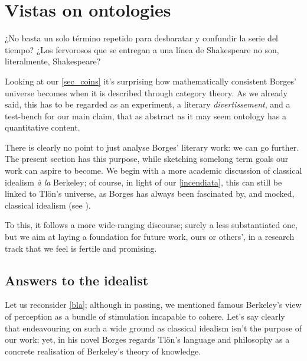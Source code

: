 \section{Vistas on ontologies}\label{vistas}
\epigraph{¿No basta un solo término repetido para desbaratar y confundir la serie del tiempo? ¿Los fervorosos que se entregan a una línea de Shakespeare no son, literalmente, Shakespeare?}{\cite{confutacion}}
Looking at our \autoref{sec_coins} it's surprising how mathematically consistent Borges' universe becomes when it is described through category theory. As we already said, this has to be regarded as an experiment, a literary \emph{divertissement}, and a test-bench for our main claim, that as abstract as it may seem ontology has a quantitative content.

There is clearly no point to just analyse Borges' literary work: we can go further. The present section has this purpose, while sketching somelong term goals our work can aspire to become. We begin with a more academic discussion of classical idealism \emph{à la} Berkeley; of course, in light of our \autoref{incendiata}, this can still be linked to Tl\"on's universe, as Borges has always been fascinated by, and mocked, classical idealism (see \cite{confutacion}).

To this, it follows a more wide-ranging discourse; surely a less substantiated one, but we aim at laying a foundation for future work, ours or others', in a research track that we feel is fertile and promising.
\subsection{Answers to the idealist}\label{berkelei}
Let us reconsider \autoref{bla}; although in passing, we mentioned famous Berkeley's view of perception as a bundle of stimulation incapable to cohere. Let's say clearly that endeavouring on such a wide ground as classical idealism isn't the purpose of our work; yet, in his novel Borges regards Tl\"on's language and philosophy as a concrete realisation of Berkeley's theory of knowledge.

